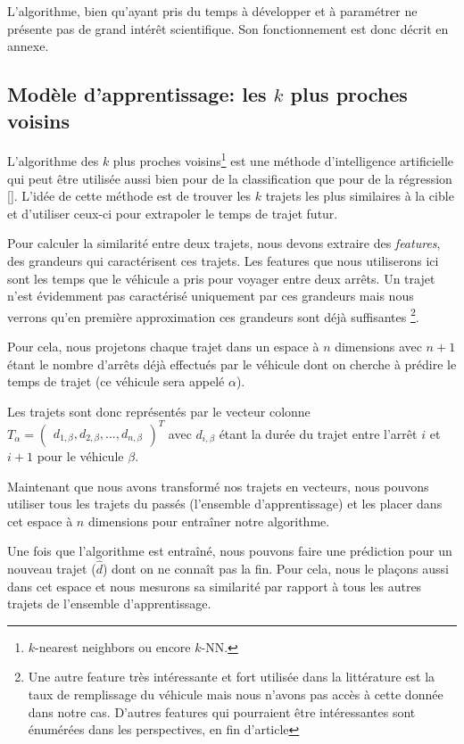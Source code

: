 \documentclass[letterpaper]{article}
\begin{document}
L'algorithme, bien qu'ayant pris du temps à développer et à paramétrer ne présente pas de grand intérêt scientifique. Son fonctionnement est donc décrit en annexe.

\subsection{Modèle d'apprentissage: les $k$ plus proches voisins}

L'algorithme des $k$ plus proches voisins\footnote{$k$-nearest neighbors ou encore $k$-NN.}
est une méthode d'intelligence artificielle qui peut être utilisée aussi bien pour de la classification que pour de la régression [\cite{trevor2009elements}].
L'idée de cette méthode est de trouver les $k$ trajets les plus similaires à la cible et d'utiliser ceux-ci pour extrapoler le temps de trajet futur.

Pour calculer la similarité entre deux trajets, nous devons extraire des \textit{features}, des grandeurs qui caractérisent ces trajets. Les features que nous utiliserons ici sont les temps que le véhicule a pris pour voyager entre deux arrêts. Un trajet n'est évidemment pas caractérisé uniquement par ces grandeurs mais nous verrons qu'en première approximation ces grandeurs sont déjà suffisantes \footnote{Une autre feature très intéressante et fort utilisée dans la littérature est la taux de remplissage du véhicule mais nous n'avons pas accès à cette donnée dans notre cas. D'autres features qui pourraient être intéressantes sont énumérées dans les perspectives, en fin d'article}.

Pour cela, nous projetons chaque trajet dans un espace à $n$ dimensions avec $n+1$ étant le nombre d'arrêts déjà effectués par le véhicule dont on cherche à prédire le temps de trajet (ce véhicule sera appelé $\alpha$).

Les trajets sont donc représentés par le vecteur colonne
$T_{\alpha} = \begin{pmatrix}d_{1,\beta}, d_{2,\beta}, ..., d_{n,\beta}\end{pmatrix}^{T}$
avec $d_{i,\beta}$ étant la durée du trajet entre l'arrêt $i$ et $i+1$ pour le véhicule $\beta$.

Maintenant que nous avons transformé nos trajets en vecteurs, nous pouvons utiliser tous les trajets du passés (l'ensemble d'apprentissage) et les placer dans cet espace à $n$ dimensions pour entraîner notre algorithme.

Une fois que l'algorithme est entraîné, nous pouvons faire une prédiction pour un nouveau trajet ($\hat{d}$) dont on ne connaît pas la fin. Pour cela, nous le plaçons aussi dans cet espace et nous mesurons sa similarité par rapport à tous les autres trajets de l'ensemble d'apprentissage.
\end{document}
